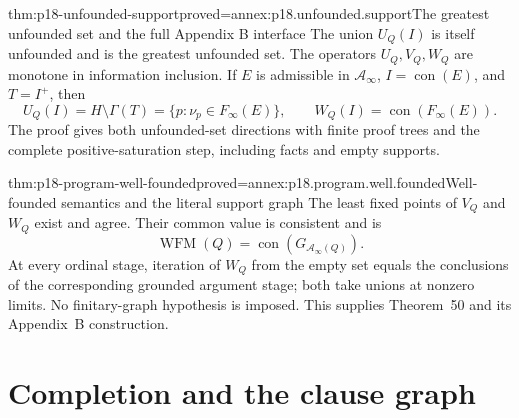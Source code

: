 \begin{hblemma}{thm:p18-unfounded-support}{proved=annex:p18.unfounded.support}{The greatest unfounded set and the full Appendix B interface}
The union \(U_Q(I)\) is itself unfounded and is the
greatest unfounded set. The operators \(U_Q,V_Q,W_Q\)
are monotone in information inclusion.
If \(E\) is admissible in \(\mathcal A_\infty\),
\(I=\operatorname{con}(E)\), and \(T=I^+\), then
\[
 U_Q(I)=H\setminus\Gamma(T)
       =\{p:\nu_p\in F_\infty(E)\},
 \qquad
        W_Q(I)=\operatorname{con}(F_\infty(E)).
\]
The proof gives both unfounded-set directions with
finite proof trees and the complete positive-saturation
step, including facts and empty supports.
\end{hblemma}

\begin{hbtheorem}{thm:p18-program-well-founded}{proved=annex:p18.program.well.founded}{Well-founded semantics and the literal support graph}
The least fixed points of \(V_Q\) and \(W_Q\) exist
and agree. Their common value is consistent and is
\[
            \operatorname{WFM}(Q)
                 =\operatorname{con}(G_{\mathcal A_\infty(Q)}).
\]
At every ordinal stage, iteration of \(W_Q\) from
the empty set equals the conclusions of the
corresponding grounded argument stage; both take
unions at nonzero limits. No finitary-graph
hypothesis is imposed. This supplies Theorem~50
and its Appendix~B construction.
\end{hbtheorem}

\section{Completion and the clause graph}

